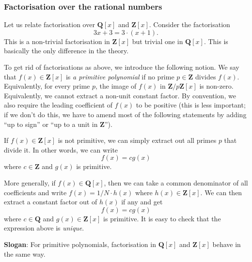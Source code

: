 \documentclass[11pt]{article}
\begin{document}
\subsubsection{Factorisation over the rational numbers}
\label{sec:org1afa8e2}
Let us relate factorisation over \(\mathbf{Q}[x]\) and \(\mathbf{Z}[x]\).
Consider the factorisation
\[ 3x+3 = 3 \cdot (x+1).\]
This is a non-trivial factorisation in \(\mathbf{Z}[x]\) but trivial one in \(\mathbf{Q}[x]\).
This is basically the only difference in the theory.

To get rid of factorisations as above, we introduce the following notion.
We say that \(f(x) \in \mathbf{Z}[x]\) is \emph{a primitive polynomial} if no prime \(p \in \mathbf{Z}\) divides \(f(x)\).
Equivalently, for every prime \(p\), the image of \(f(x)\) in \(\mathbf{Z}/p \mathbf{Z}[x]\) is non-zero.
Equivalently, we cannot extract a non-unit constant factor.
By convention, we also require the leading coefficient of \(f(x)\) to be positive (this is less important; if we don't do this, we have to amend most of the following statements by adding ``up to sign'' or ``up to a unit in \(\mathbf{Z}\)'').

If \(f(x)\in \mathbf{Z}[x]\) is not primitive, we can simply extract out all primes \(p\) that divide it.
In other words, we can write
\[ f(x) = c g(x)\]
where \(c \in \mathbf{Z}\) and \(g(x)\) is primitive.

More generally, if \(f(x) \in \mathbf{Q}[x]\), then we can take a common denominator of all coefficients and write \(f(x) = 1/N \cdot h(x)\) where \(h(x) \in \mathbf{Z}[x]\).
We can then extract a constant factor out of \(h(x)\) if any and get
\[ f(x) = c g(x) \]
where \(c \in \mathbf{Q}\) and \(g(x) \in \mathbf{Z}[x]\) is primitive.
It is easy to check that the expression above is \emph{unique}.

\textbf{Slogan}: For primitive polynomials, factorisation in \(\mathbf{Q}[x]\) and \(\mathbf{Z}[x]\) behave in the same way.
\end{document}
